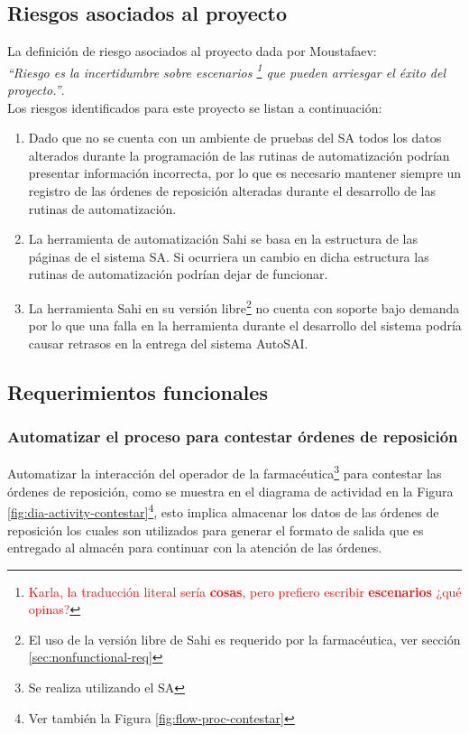 \subsection{Riesgos asociados al proyecto}\label{sec-riesgos}
La definición de riesgo asociados al proyecto dada por Moustafaev:\\
\textit{``Riesgo es la incertidumbre sobre escenarios \footnote{\textcolor{red}{Karla, la traducción literal sería \textbf{cosas}, pero prefiero escribir \textbf{escenarios} ¿qué opinas?}} que pueden arriesgar el éxito del proyecto.''}\cite{ScopeManagement}.\\
Los riesgos identificados para este proyecto se listan a continuación:
\begin{enumerate}
  \item Dado que no se cuenta con un ambiente de pruebas del SA todos los datos alterados durante la programación de las rutinas de automatización podrían presentar información incorrecta, por lo que es necesario mantener siempre un registro de las órdenes de reposición alteradas durante el desarrollo de las rutinas de automatización.
  \item La herramienta de automatización Sahi se basa en la estructura de las páginas de el sistema SA. Si ocurriera un cambio en dicha estructura las rutinas de automatización podrían dejar de funcionar.
  \item La herramienta Sahi en su versión libre\footnote{El uso de la versión libre de Sahi es requerido por la farmacéutica, ver sección \ref{sec:nonfunctional-req}} no cuenta con soporte bajo demanda por lo que una falla en la herramienta durante el desarrollo del sistema podría causar retrasos en la entrega del sistema AutoSAI.
\end{enumerate}


\subsection{Requerimientos funcionales}
\subsubsection{Automatizar el proceso para contestar órdenes de reposición}
Automatizar la interacción del operador de la farmacéutica\footnote{Se realiza utilizando el SA} para contestar las órdenes de reposición, como se muestra en el diagrama de actividad en la Figura \ref{fig:dia-activity-contestar}\footnote{Ver también la Figura \ref{fig:flow-proc-contestar}}, esto implica almacenar los datos de las órdenes de reposición los cuales son utilizados para generar el formato de salida que es entregado al almacén para continuar con la atención de las órdenes.

